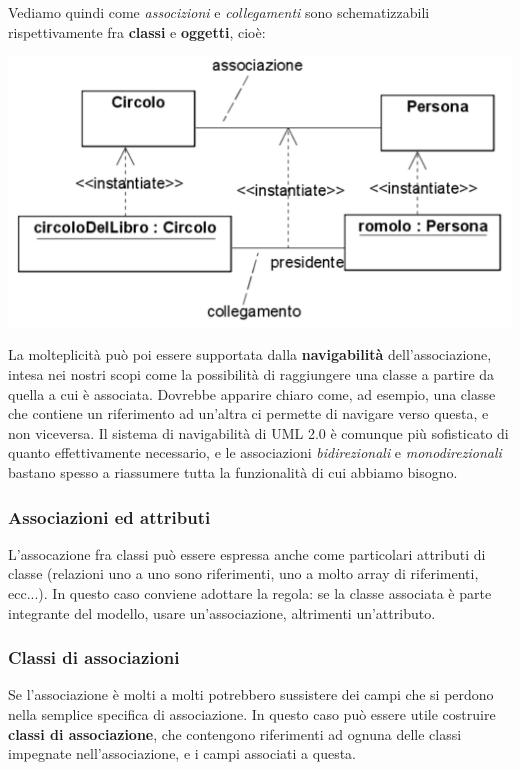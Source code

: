 \documentclass[a4paper,11pt]{article}
\begin{document}
Vediamo quindi come \textit{associzioni} e \textit{collegamenti} sono schematizzabili rispettivamente fra \textbf{classi} e \textbf{oggetti}, cioè:
\begin{center}
	\includegraphics[scale=0.3]{../figures/assoc_colleg.png}
\end{center}

La molteplicità può poi essere supportata dalla \textbf{navigabilità} dell'associazione, intesa nei nostri scopi come la possibilità di raggiungere una classe a partire da quella a cui è associata.
Dovrebbe apparire chiaro come, ad esempio, una classe che contiene un riferimento ad un'altra ci permette di navigare verso questa, e non viceversa.
Il sistema di navigabilità di UML 2.0 è comunque più sofisticato di quanto effettivamente necessario, e le associazioni \textit{bidirezionali} e \textit{monodirezionali} bastano spesso a riassumere tutta la funzionalità di cui abbiamo bisogno.

\subsubsection{Associazioni ed attributi}
L'assocazione fra classi può essere espressa anche come particolari attributi di classe (relazioni uno a uno sono riferimenti, uno a molto array di riferimenti, ecc...).
In questo caso conviene adottare la regola: se la classe associata è parte integrante del modello, usare un'associazione, altrimenti un'attributo.

\subsubsection{Classi di associazioni}
Se l'associazione è molti a molti potrebbero sussistere dei campi che si perdono nella semplice specifica di associazione.
In questo caso può essere utile costruire \textbf{classi di associazione}, che contengono riferimenti ad ognuna delle classi impegnate nell'associazione, e i campi associati a questa.
\end{document}
